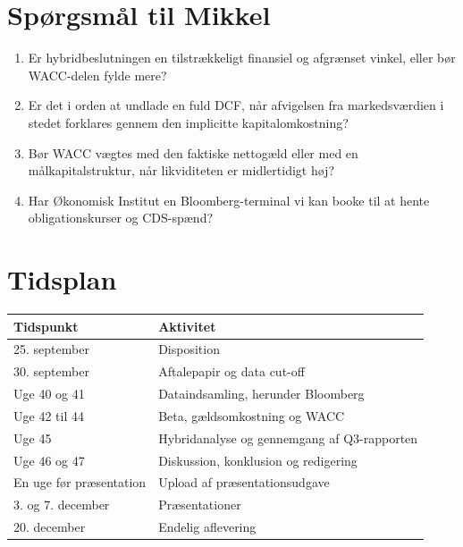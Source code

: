 \documentclass[11pt,a4paper]{article}
\begin{document}
\section{Spørgsmål til Mikkel}

\begin{enumerate}
  \item Er hybridbeslutningen en tilstrækkeligt finansiel og afgrænset vinkel, eller bør WACC-delen fylde mere?
  \item Er det i orden at undlade en fuld DCF, når afvigelsen fra markedsværdien i stedet forklares gennem den implicitte kapitalomkostning?
  \item Bør WACC vægtes med den faktiske nettogæld eller med en målkapitalstruktur, når likviditeten er midlertidigt høj?
  \item Har Økonomisk Institut en Bloomberg-terminal vi kan booke til at hente obligationskurser og CDS-spænd?
\end{enumerate}

\section{Tidsplan}

\begin{center}
\small
\begin{tabular}{@{}ll@{}}
\toprule
\textbf{Tidspunkt} & \textbf{Aktivitet} \\
\midrule
25. september & Disposition \\
30. september & Aftalepapir og data cut-off \\
Uge 40 og 41 & Dataindsamling, herunder Bloomberg \\
Uge 42 til 44 & Beta, gældsomkostning og WACC \\
Uge 45 & Hybridanalyse og gennemgang af Q3-rapporten \\
Uge 46 og 47 & Diskussion, konklusion og redigering \\
En uge før præsentation & Upload af præsentationsudgave \\
3. og 7. december & Præsentationer \\
20. december & Endelig aflevering \\
\bottomrule
\end{tabular}
\end{center}

\newpage 



\end{document}
